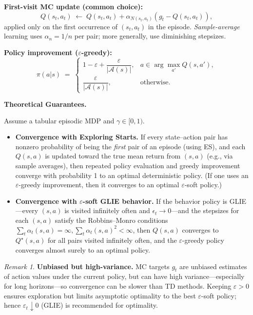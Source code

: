 \documentclass[
]{book}
\theoremstyle{definition}
\theoremstyle{definition}
\theoremstyle{definition}
\theoremstyle{definition}
\theoremstyle{remark}
\newtheorem*{remark}{Remark}
\begin{document}
\textbf{First-visit MC update (common choice):}
\begin{equation}
Q(s_t,a_t) \;\leftarrow\; Q(s_t,a_t) + \alpha_{N(s_t,a_t)}\!\left(g_t - Q(s_t,a_t)\right),
\label{eq:MCControl-QUpdate}
\end{equation}
applied only on the first occurrence of \((s_t,a_t)\) in the episode. \emph{Sample-average} learning uses \(\alpha_n = 1/n\) per pair; more generally, use diminishing stepsizes.

\textbf{Policy improvement (\(\varepsilon\)-greedy):}
\begin{equation}
\pi(a|s) \;=\;
\begin{cases}
1-\varepsilon + \dfrac{\varepsilon}{|\mathcal{A}(s)|}, & a \in \arg\max_{a'} Q(s,a'), \\
\dfrac{\varepsilon}{|\mathcal{A}(s)|}, & \text{otherwise}.
\end{cases}
\label{eq:MCControl-PI}
\end{equation}

\textbf{Theoretical Guarantees.}

Assume a tabular episodic MDP and \(\gamma \in [0,1)\).

\begin{itemize}
\item
  \textbf{Convergence with Exploring Starts.} If every state--action pair has nonzero probability of being the \emph{first} pair of an episode (using ES), and each \(Q(s,a)\) is updated toward the true mean return from \((s,a)\) (e.g., via sample averages), then repeated policy evaluation and greedy improvement converge with probability 1 to an optimal deterministic policy. (If one uses an \(\varepsilon\)-greedy improvement, then it converges to an optimal \(\varepsilon\)-soft policy.)
\item
  \textbf{Convergence with \(\varepsilon\)-soft GLIE behavior.} If the behavior policy is GLIE---every \((s,a)\) is visited infinitely often and \(\epsilon_t \to 0\)---and the stepsizes for each \((s,a)\) satisfy the Robbins--Monro conditions \(\sum_{t} \alpha_t(s,a) = \infty,\sum_{t} \alpha_t(s,a)^2 < \infty\), then \(Q(s,a)\) converges to \(Q^\star(s,a)\) for all pairs visited infinitely often, and the \(\varepsilon\)-greedy policy converges almost surely to an optimal policy.
\end{itemize}

\begin{remark}
\textbf{Unbiased but high-variance.} MC targets \(g_t\) are unbiased estimates of action values under the current policy, but can have high variance---especially for long horizons---so convergence can be slower than TD methods. Keeping \(\varepsilon>0\) ensures exploration but limits asymptotic optimality to the best \(\varepsilon\)-soft policy; hence \(\varepsilon_t \downarrow 0\) (GLIE) is recommended for optimality.
\end{remark}
\end{document}
